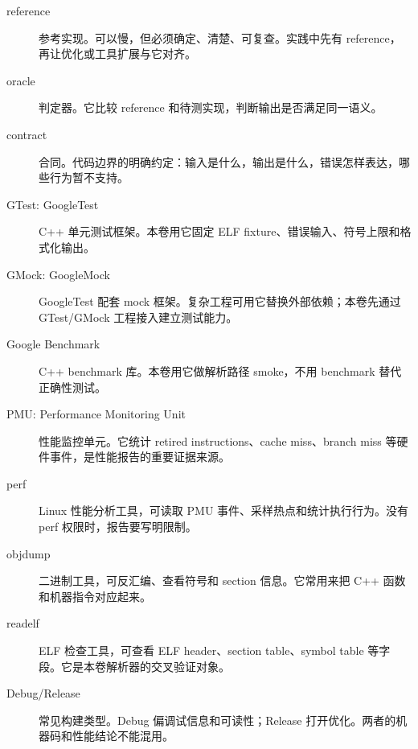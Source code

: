 \begin{description}
  \item[reference] 参考实现。可以慢，但必须确定、清楚、可复查。实践中先有 reference，再让优化或工具扩展与它对齐。
  \item[oracle] 判定器。它比较 reference 和待测实现，判断输出是否满足同一语义。
  \item[contract] 合同。代码边界的明确约定：输入是什么，输出是什么，错误怎样表达，哪些行为暂不支持。
  \item[GTest: GoogleTest] C++ 单元测试框架。本卷用它固定 ELF fixture、错误输入、符号上限和格式化输出。
  \item[GMock: GoogleMock] GoogleTest 配套 mock 框架。复杂工程可用它替换外部依赖；本卷先通过 GTest/GMock 工程接入建立测试能力。
  \item[Google Benchmark] C++ benchmark 库。本卷用它做解析路径 smoke，不用 benchmark 替代正确性测试。
  \item[PMU: Performance Monitoring Unit] 性能监控单元。它统计 retired instructions、cache miss、branch miss 等硬件事件，是性能报告的重要证据来源。
  \item[perf] Linux 性能分析工具，可读取 PMU 事件、采样热点和统计执行行为。没有 perf 权限时，报告要写明限制。
  \item[objdump] 二进制工具，可反汇编、查看符号和 section 信息。它常用来把 C++ 函数和机器指令对应起来。
  \item[readelf] ELF 检查工具，可查看 ELF header、section table、symbol table 等字段。它是本卷解析器的交叉验证对象。
  \item[Debug/Release] 常见构建类型。Debug 偏调试信息和可读性；Release 打开优化。两者的机器码和性能结论不能混用。
\end{description}
